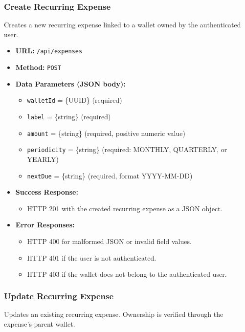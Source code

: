 \subsubsection{Create Recurring Expense}

Creates a new recurring expense linked to a wallet owned by the authenticated user.

\begin{itemize}
    \item \textbf{URL:} \texttt{/api/expenses}
    \item \textbf{Method:} \texttt{POST}
    \item \textbf{Data Parameters (JSON body):}
    \begin{itemize}
        \item \texttt{walletId} = \{UUID\} (required)
        \item \texttt{label} = \{string\} (required)
        \item \texttt{amount} = \{string\} (required, positive numeric value)
        \item \texttt{periodicity} = \{string\} (required: MONTHLY, QUARTERLY, or YEARLY)
        \item \texttt{nextDue} = \{string\} (required, format YYYY-MM-DD)
    \end{itemize}
    \item \textbf{Success Response:}
    \begin{itemize}
        \item HTTP 201 with the created recurring expense as a JSON object.
    \end{itemize}
    \item \textbf{Error Responses:}
    \begin{itemize}
        \item HTTP 400 for malformed JSON or invalid field values.
        \item HTTP 401 if the user is not authenticated.
        \item HTTP 403 if the wallet does not belong to the authenticated user.
    \end{itemize}
\end{itemize}

\subsubsection{Update Recurring Expense}

Updates an existing recurring expense. Ownership is verified through the expense's parent wallet.


